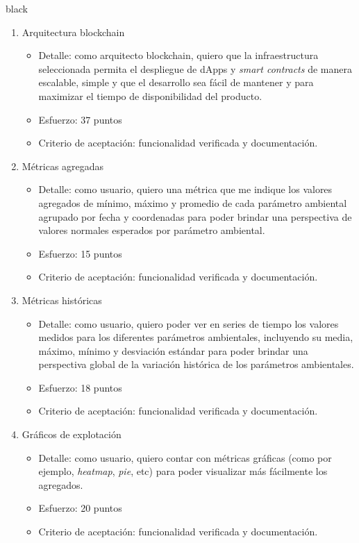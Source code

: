 \documentclass[
11pt, %
]{charter}
\begin{document}
\begin{consigna}{black}
\begin{enumerate}
	\item Arquitectura blockchain
	\begin{itemize}
		\item Detalle: como arquitecto blockchain, quiero que la infraestructura seleccionada permita el despliegue de dApps y \textit{smart contracts} de manera escalable, simple y que el desarrollo sea fácil de mantener y para maximizar el tiempo de disponibilidad del producto.
		\item Esfuerzo: 37 puntos
		\item Criterio de aceptación: funcionalidad verificada y documentación.
	\end{itemize}

	\item Métricas agregadas
	\begin{itemize}
		\item Detalle: como usuario, quiero una métrica que me indique los valores agregados de mínimo, máximo y promedio de cada parámetro ambiental agrupado por fecha y coordenadas para poder brindar una perspectiva de valores normales esperados por parámetro ambiental.
		\item Esfuerzo: 15 puntos
		\item Criterio de aceptación: funcionalidad verificada y documentación.
	\end{itemize}

	\item Métricas históricas
	\begin{itemize}
		\item Detalle: como usuario, quiero poder ver en series de tiempo los valores medidos para los diferentes parámetros ambientales, incluyendo su media, máximo, mínimo y desviación estándar para poder brindar una perspectiva global de la variación histórica de los parámetros ambientales.
		\item Esfuerzo: 18 puntos
		\item Criterio de aceptación: funcionalidad verificada y documentación.
	\end{itemize}
	
	\item Gráficos de explotación
	\begin{itemize}
		\item Detalle: como usuario, quiero contar con métricas gráficas (como por ejemplo, \textit{heatmap}, \textit{pie}, etc) para poder visualizar más fácilmente los agregados.
		\item Esfuerzo: 20 puntos
		\item Criterio de aceptación: funcionalidad verificada y documentación.
	\end{itemize}
	

\end{enumerate}
\end{consigna}
\end{document}
